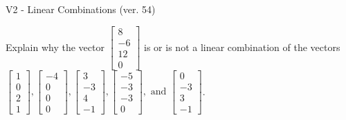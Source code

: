 \begin{exercise}
  \begin{exerciseTitle}V2 - Linear Combinations (ver. 54)\end{exerciseTitle}
  \begin{exerciseStatement}
    Explain why the vector \(\left[\begin{array}{c}
8 \\
-6 \\
12 \\
0
\end{array}\right]\)  is or is not a linear 
	combination of the vectors \(\left[\begin{array}{c}
1 \\
0 \\
2 \\
1
\end{array}\right] , \left[\begin{array}{c}
-4 \\
0 \\
0 \\
0
\end{array}\right] , \left[\begin{array}{c}
3 \\
-3 \\
4 \\
-1
\end{array}\right] , \left[\begin{array}{c}
-5 \\
-3 \\
-3 \\
0
\end{array}\right] , \text{ and } \left[\begin{array}{c}
0 \\
-3 \\
3 \\
-1
\end{array}\right]\).
	



\end{exerciseStatement}
\end{exercise}
